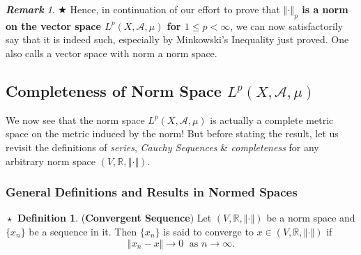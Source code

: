 \documentclass{article}
\theoremstyle{definition}
\newtheorem{definition}{$\boxed{\star}$ Definition}
\theoremstyle{remark}
\newtheorem*{remark}{\textbf{Remark}}
\theoremstyle{definition}
\theoremstyle{definition}
\theoremstyle{definition}
\newcommand{\norm}[1]{\left \Vert #1 \right \Vert}
\newcommand{\R}{\mathbb{R}}
\newcommand{\alg}[1]{\mathscr{#1}}
\newcommand{\Lp}[1]{L^{p}\left (#1\right )}
\begin{document}
\begin{remark}
 $ \bigstar $ Hence, in continuation of our effort to prove that \textbf{$ \norm{\cdot}_p $ is a norm on the vector space $ \Lp{X,\alg{A},\mu} $ for $ 1\le p<\infty $}, we can now satisfactorily say that it is indeed such, especially by Minkowski's Inequality just proved. One also calls a vector space with norm a norm space.
\end{remark}

\hrulefill
\newpage
\subsection{Completeness of Norm Space $ \Lp{X,\alg{A},\mu} $}
We now see that the norm space $ \Lp{X,\alg{A},\mu} $ is actually a complete metric space on the metric induced by the norm! But before stating the result, let us revisit the definitions of \emph{series}, \emph{Cauchy Sequences} \& \emph{completeness} for any arbitrary norm space $ (V,\R,\norm{\cdot}) $.    
\subsubsection{General Definitions and Results in Normed Spaces}
\begin{definition}
	(\textbf{Convergent Sequence}) Let $ (V,\R,\norm{\cdot}) $ be a norm space and $ \{x_n\} $ be a sequence in it. Then $ \{x_n\} $ is said to converge to $ x\in (V,\R,\norm{\cdot}) $ if 
	\[\norm{x_n - x} \longrightarrow 0\;\text{ as }n\to \infty.\]
\end{definition}
\hrulefill
\end{document}
